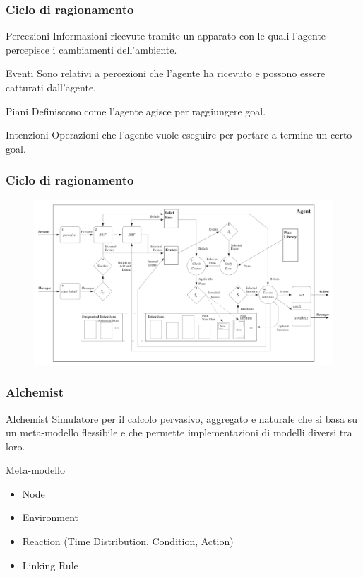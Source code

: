 \documentclass[handout]{beamer}\mode<presentation>{\usetheme{AMSCesenaBleu}}
\begin{document}
\begin{frame}
\frametitle{Ciclo di ragionamento}
\begin{block}{Percezioni}
Informazioni ricevute tramite un apparato con le quali l'agente percepisce i cambiamenti dell'ambiente.
\end{block}

\begin{block}{Eventi}
Sono relativi a percezioni che l'agente ha ricevuto e possono essere catturati dall'agente.
\end{block}

\begin{block}{Piani}
Definiscono come l'agente agisce per raggiungere goal.
\end{block}

\begin{block}{Intenzioni}
Operazioni che l'agente vuole eseguire per portare a termine un certo goal.
\end{block}
\end{frame}

\begin{frame}
\frametitle{Ciclo di ragionamento}
\begin{figure}
\hspace*{-0.35cm}
\includegraphics[width=12.5cm]{images/reasoningCicle.png}
\end{figure}
\end{frame}

\begin{frame}
\frametitle{Alchemist}
\begin{block}{Alchemist}
Simulatore per il calcolo pervasivo, aggregato e naturale che si basa su un meta-modello flessibile e che permette implementazioni di modelli diversi tra loro.
\end{block}
\begin{block}{Meta-modello}
\begin{itemize}
\item Node
\item Environment
\item Reaction (Time Distribution, Condition, Action)
\item Linking Rule
\end{itemize}
\end{block}
\end{frame}
\end{document}
